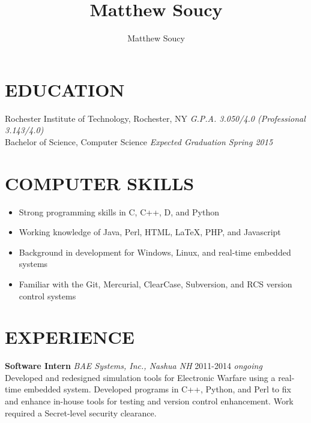 \documentclass[line]{res}
\author{Matthew Soucy}
\title{Matthew Soucy}
\begin{document}
\setlength{\textheight}{11.5in} %
\address{\large
	2433 Nathaniel Rochester Hall
	\\
	Rochester, NY 14623
	\\
	(585) 204-7402
}

\begin{resume}

\section{EDUCATION}

	Rochester Institute of Technology, Rochester, NY
	\hfill
	\textit{G.P.A. 3.050/4.0 (Professional 3.143/4.0)}
	\\
	Bachelor of Science, Computer Science
	\hfill
	\textit{Expected Graduation Spring 2015}

\section{COMPUTER SKILLS}

	\begin{itemize}[leftmargin=10pt]
	\item Strong programming skills in C, C++, D, and Python
	\item Working knowledge of Java, Perl, HTML, LaTeX, PHP, and Javascript
	\item Background in development for Windows, Linux, and real-time embedded systems
	\item Familiar with the Git, Mercurial, ClearCase, Subversion, and RCS version control systems
	\end{itemize}

\section{EXPERIENCE}

	\textbf{Software Intern}
	\textit{BAE Systems, Inc., Nashua NH}
	\hfill
	2011-2014 \textit{ongoing}\\
	Developed and redesigned simulation tools for Electronic Warfare using a real-time embedded system.
	Developed programs in C++, Python, and Perl to fix and enhance in-house tools for testing and version control enhancement.
	Work required a Secret-level security clearance.


\end{resume}
\end{document}
